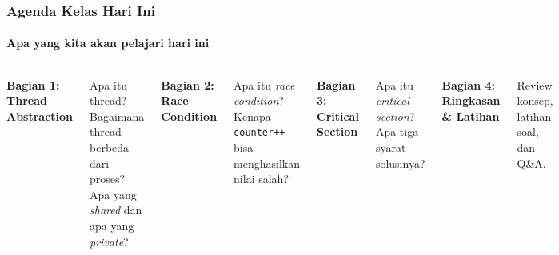 \documentclass[t,aspectratio=169,xcolor=dvipsnames]{beamer}
\begin{document}
\begin{frame}
    \frametitle{Agenda Kelas Hari Ini}
    \framesubtitle{Apa yang kita akan pelajari hari ini}
    \small

    \begin{columns}[T]
        \textbf{Bagian 1: Thread Abstraction}

        \vspace{0.1cm}
        Apa itu thread? Bagaimana thread berbeda dari proses? Apa yang \textit{shared} dan apa yang \textit{private}?

        \vspace{0.35cm}
        \textbf{Bagian 2: Race Condition}

        \vspace{0.1cm}
        Apa itu \textit{race condition}? Kenapa \texttt{counter++} bisa menghasilkan nilai salah?

        \textbf{Bagian 3: Critical Section}

        \vspace{0.1cm}
        Apa itu \textit{critical section}? Apa tiga syarat solusinya?

        \vspace{0.35cm}
        \textbf{Bagian 4: Ringkasan \& Latihan}

        \vspace{0.1cm}
        Review konsep, latihan soal, dan Q\&A.
    \end{columns}
\end{frame}
\end{document}
